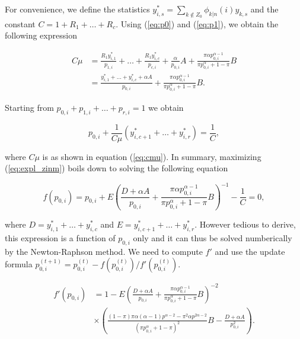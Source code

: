 \documentclass[12pt]{article}
\begin{document}
\begin{appendices}
    For convenience, we define the statistics
    $y_{i,s}^* = \sum_{k \notin Z_0} \phi_{k|n}(i) y_{k,s}$
    and the constant $C = 1 + R_1 + \ldots + R_c$.
    Using (\ref{eq:p0}) and (\ref{eq:p1}), we obtain the following
    expression

    \begin{align}
      C \mu &= \frac{R_1y_{i,1}^*}{p_{1,i}} +
        \ldots + \frac{R_1y_{i,c}^*}{p_{c,i}} + \frac{\alpha}{p_{0,i}}A
      + \frac{\pi\alpha p_{0,i}^{\alpha-1}} {\pi p_{0,i}^{\alpha} +
      1-\pi} B \nonumber \\
\label{eq:cmu}
      &= \frac{y_{i,1}^* + \ldots + y_{i,c}^*+\alpha A}{p_{0,i}}
      + \frac{\pi\alpha p_{0,i}^{\alpha-1}} {\pi p_{0,i}^{\alpha} +
      1-\pi} B.
    \end{align}

    Starting from $p_{0,i} + p_{1,i} + \ldots + p_{r,i} = 1$ we
    obtain

    \begin{equation*}
      p_{0,i} + \frac{1}{C\mu} (y_{i,c+1}^* + \ldots
      + y_{i,r}^*) = \frac{1}{C},
    \end{equation*}

    \noindent
    where $C\mu$ is as shown in equation (\ref{eq:cmu}). In summary,
    maximizing (\ref{eq:expl_zinm}) boils down to solving the
    following equation

    \begin{equation*}
      f(p_{0,i}) = p_{0,i} + E \left(\frac{D + \alpha A}
      {p_{0,i}} + \frac{\pi\alpha p_{0,i}^{\alpha-1}}
      {\pi p_{0,i}^{\alpha} + 1-\pi} B\right)^{-1} - \frac{1}{C} = 0,
    \end{equation*}

    \noindent
    where $D = y_{i,1}^* + \ldots + y_{i,c}^*$ and
    $E = y_{i,c+1}^* + \ldots + y_{i,r}^*$.
    However tedious to derive,
    this expression is a function of $p_{0,i}$ only and it can
    thus be solved numberically by the Newton-Raphson
    method. We need to compute $f'$ and use the update formula
    $p_{0,i}^{(t+1)} = p_{0,i}^{(t)} -
    f(p_{0,i}^{(t)})/f'(p_{0,i}^{(t)})$.

    
    \begin{align*}
      f'(p_{0,i}) &= 1 - E
      \left( \frac{D +\alpha A}{p_{0,i}}
      + \frac{\pi\alpha p_{0,i}^{\alpha-1}}
      {\pi p_{0,i}^{\alpha} + 1-\pi} B\right)^{-2} \\
      &\times \left( \frac{(1-\pi)\pi\alpha(\alpha-1)p^{\alpha-2}
        -\pi^2\alpha p^{2\alpha-2}}{(\pi p_{0,i}^{\alpha}+1-\pi)^2}B
      -\frac{D + \alpha A}{p_{0,i}^2}
       \right).
    \end{align*}


\end{appendices}
\end{document}
